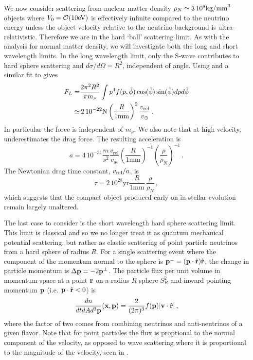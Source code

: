 We now consider scattering from nuclear matter density $\rho_N\simeq 3 \, 10^{8}{\rm kg/mm}^3$ objects where $V_0={\cal O}(10\text{eV})$ is effectively infinite compared to the neutrino energy unless the object velocity relative to the neutrino background is ultra-relativistic.  Therefore we are in the hard `ball' scattering limit. As with the analysis for normal matter density, we will investigate both the long and short wavelength limits. In the long wavelength limit, only the S-wave contributes to hard sphere scattering and $d\sigma/d\Omega=R^2$, independent of angle. Using  and a similar fit to  gives
\begin{align}\label{FLHard}
F_L=&\frac{2\pi^2R^2}{\pi m_\nu} \int p^4 f(p,\tilde\phi) \cos(\tilde\phi) \sin(\tilde\phi) dpd\tilde\phi\notag\\
\simeq &\, 2\, 10^{-22}{\rm N}\left(\frac{R}{1\text{mm}}\right)^2\frac{v_{\text{rel}}}{v_\oplus}\,.
\end{align}
In particular the force is independent of $m_\nu$.  We also note that at high velocity,   underestimates the drag force. The resulting acceleration is
\begin{equation}
a=4\, 10^{-31}\frac{m}{s^2}\frac{v_{\text{rel}} }{v_\oplus}\! \left(\frac{R}{1\text{mm}}\right)^{-1}\!\!\left(\frac{\rho}{\rho_N}\right)^{-1}\,.\!\!
\end{equation}
The Newtonian drag time constant, $v_{\rm rel}/a$, is
\begin{equation}
\tau= 2\,10^{28}\text{yr}\frac{R}{1\text{mm}}\,\frac{\rho}{\rho_N}\,,
\end{equation}
which suggests that the compact object produced early on in stellar evolution remain largely unaltered.

The last case to consider is the short wavelength hard sphere scattering limit.  This limit is classical and so we no longer treat it as quantum mechanical potential scattering, but rather as elastic scattering of point particle neutrinos from a hard sphere of radius $R$.  For a single scattering event where the component of the momentum normal to the sphere is ${\bf p}^\perp=({\bf p}\cdot \hat {\bf r}) \hat {\bf r}$, the change in particle momentum is  $\Delta {\bf p}=-2{\bf p}^\perp$. The particle flux per unit volume in momentum space at a point ${\bf r}$ on a radius $R$ sphere $S_R^2$ and inward pointing momentum ${\bf p}$ (i.e. ${\bf p}\cdot \hat{\bf  r}<0$) is
\begin{equation}\label{dn_classical}
\frac{dn}{dtd Ad^3{\bf p}}({\bf x},{\bf p})=\frac{2}{(2\pi)^3}f({\bf p})|{\bf v}\cdot \hat{\bf r}|\,,
\end{equation}
where the factor of two comes from combining neutrinos and anti-neutrinos of a given flavor.  Note that for point particles the flux is proptional to the normal component of the velocity, as opposed to wave scattering where it is proportional to the magnitude of the velocity, seen in .

